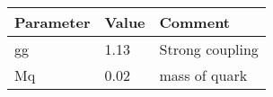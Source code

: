 \begin{tabular}{|l|l|l|} \hline
Parameter & Value & Comment \\ \hline
gg    &1.13                &Strong coupling \\
Mq    &0.02                &mass of quark \\ \hline
\end{tabular}
